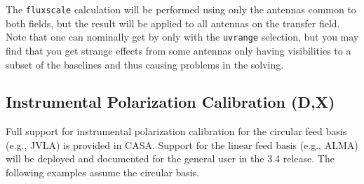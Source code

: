The {\tt fluxscale} calculation will be performed using only the
antennas common 
to both fields, but the result will be applied to all antennas on the
transfer field.  Note that one can nominally get by only with the
{\tt uvrange} selection, but you may find that you get strange
effects from some antennas only having visibilities to a subset of
the baselines and thus causing problems in the solving.

\subsection{Instrumental Polarization Calibration (D,X)}
\label{section:cal.solve.pol}

Full support for instrumental polarization calibration for the 
circular feed basis (e.g., JVLA) is provided in CASA.  Support for 
the linear feed basis (e.g., ALMA) will be deployed and documented
for the general user in the 3.4 release.  The following examples
assume the circular basis.

